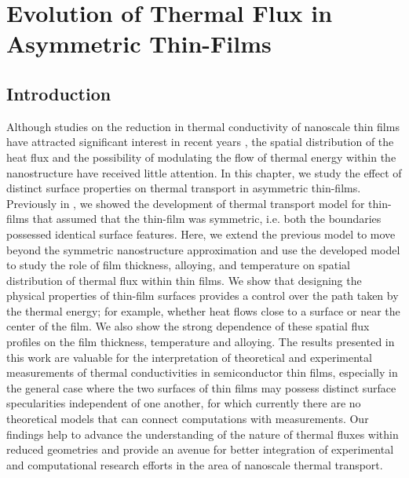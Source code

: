 \chapter{Evolution of Thermal Flux in Asymmetric Thin-Films}
\label{chap:diff_boundary}
\section{Introduction} 
 Although studies on the reduction in thermal conductivity of nanoscale thin films have attracted significant interest in recent years \cite{RN286,RN120,RN46,RN127,RN207,RN204,maldovan2011tf,RN189,RN208}, the spatial distribution of the heat flux and the possibility of modulating the flow of thermal energy within the nanostructure have received little attention. In this chapter, we study the effect of distinct surface properties on thermal transport in asymmetric thin-films. Previously in , we showed the development of thermal transport model for thin-films that assumed that the thin-film was symmetric, i.e. both the boundaries possessed identical surface features. Here, we extend the previous model to move beyond the symmetric nanostructure approximation and use the developed model to study the role of film thickness, alloying, and temperature on spatial distribution of thermal flux within thin films. We show that designing the physical properties of thin-film surfaces provides a control over the path taken by the thermal energy; for example, whether heat flows close to a surface or near the center of the film. We also show the strong dependence of these spatial flux profiles on the film thickness, temperature and alloying. The results presented in this work are valuable for the interpretation of theoretical and experimental measurements of thermal conductivities in semiconductor thin films, especially in the general case where the two surfaces of thin films may possess distinct surface specularities independent of one another, for which currently there are no theoretical models that can connect computations with measurements. Our findings help to advance the understanding of the nature of thermal fluxes within reduced geometries and provide an avenue for better integration of experimental and computational research efforts in the area of nanoscale thermal transport.
